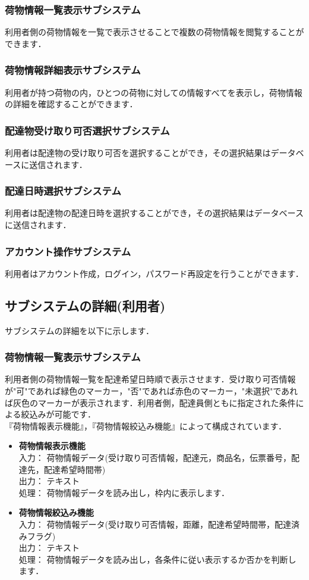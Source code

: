\documentclass[a4j,titlepage]{jarticle}
\begin{document}
\subsubsection{荷物情報一覧表示サブシステム}
利用者側の荷物情報を一覧で表示させることで複数の荷物情報を閲覧することができます．

\subsubsection{荷物情報詳細表示サブシステム}
利用者が持つ荷物の内，ひとつの荷物に対しての情報すべてを表示し，荷物情報の詳細を確認することができます．

\subsubsection{配達物受け取り可否選択サブシステム}
利用者は配達物の受け取り可否を選択することができ，その選択結果はデータベースに送信されます．

\subsubsection{配達日時選択サブシステム}
利用者は配達物の配達日時を選択することができ，その選択結果はデータベースに送信されます．

\subsubsection{アカウント操作サブシステム}
利用者はアカウント作成，ログイン，パスワード再設定を行うことができます．

\subsection{サブシステムの詳細(利用者)}
サブシステムの詳細を以下に示します．

\subsubsection{荷物情報一覧表示サブシステム}
利用者側の荷物情報一覧を配達希望日時順で表示させます．受け取り可否情報が"可"であれば緑色のマーカー，"否"であれば赤色のマーカー，"未選択"であれば灰色のマーカーが表示されます．利用者側，配達員側ともに指定された条件による絞込みが可能です．\\
『荷物情報表示機能』，『荷物情報絞込み機能』によって構成されています．
\begin{itemize}
\item \textbf{荷物情報表示機能} \\
入力： 荷物情報データ(受け取り可否情報，配達元，商品名，伝票番号，配達先，配達希望時間帯) \\
出力： テキスト \\
処理： 荷物情報データを読み出し，枠内に表示します．
\item \textbf{荷物情報絞込み機能} \\
入力： 荷物情報データ(受け取り可否情報，距離，配達希望時間帯，配達済みフラグ) \\
出力： テキスト \\
処理： 荷物情報データを読み出し，各条件に従い表示するか否かを判断します．
\end{itemize}
\end{document}
